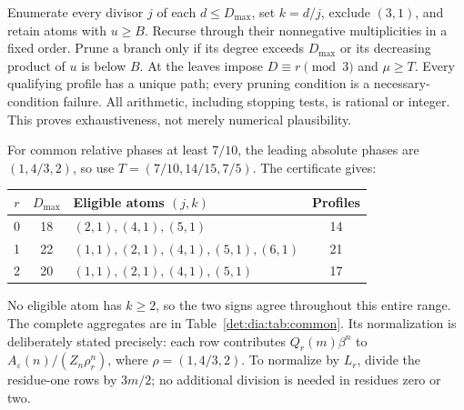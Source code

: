 \documentclass[11pt,letterpaper]{article}
\numberwithin{equation}{section}
\theoremstyle{definition}\newtheorem{definition}[theorem]{Definition}
\theoremstyle{remark}\newtheorem{remark}[theorem]{Remark}
\newcommand{\eps}{\varepsilon}
\begin{document}
Enumerate every divisor $j$ of each $d\leq D_{\max}$, set $k=d/j$,
exclude $(3,1)$, and retain atoms with $u\geq B$. Recurse through their
nonnegative multiplicities in a fixed order. Prune a branch only if its
degree exceeds $D_{\max}$ or its decreasing product of $u$ is below $B$.
At the leaves impose $D\equiv r\pmod3$ and $\mu\geq T$. Every
qualifying profile has a unique path; every pruning condition is a
necessary-condition failure. All arithmetic, including stopping tests,
is rational or integer. This proves exhaustiveness, not merely numerical
plausibility.

For common relative phases at least $7/10$, the leading absolute phases
are $(1,4/3,2)$, so use $T=(7/10,14/15,7/5)$. The certificate gives:
\begin{center}
\begin{tabular}{cclc}
\toprule
$r$ & $D_{\max}$ & Eligible atoms $(j,k)$ & Profiles\\
\midrule
0&18&$(2,1),(4,1),(5,1)$&14\\
1&22&$(1,1),(2,1),(4,1),(5,1),(6,1)$&21\\
2&20&$(1,1),(2,1),(4,1),(5,1)$&17\\
\bottomrule
\end{tabular}
\end{center}
No eligible atom has $k\geq2$, so the two signs agree throughout this
entire range. The complete aggregates are in Table~\ref{det:dia:tab:common}.
Its normalization is deliberately stated precisely: each row contributes
$Q_r(m)\beta^n$ to
$A_\eps(n)/(Z_n\rho_r^n)$, where $\rho=(1,4/3,2)$.
To normalize by $L_r$, divide the residue-one rows by $3m/2$; no additional
division is needed in residues zero or two.
\end{document}
